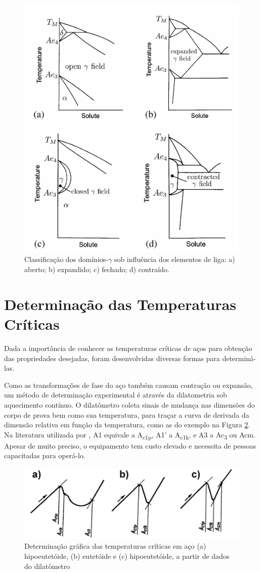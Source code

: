 \documentclass[brazil,tf,epusp]{usp}  %
\begin{document}
\begin{figure}[ht!]
  \includegraphics[width=.7\textwidth]{img/elementos-liga.png}
  \caption{Classificação dos domínios-$\gamma$ sob influência dos elementos de liga: a) aberto; b) expandido; c) fechado; d) contraído. \cite{Honeycombe1982}}
  \label{fig:elem-liga}
\end{figure}

\section{Determinação das Temperaturas Críticas}

Dada a importância de conhecer as temperaturas críticas de aços para obtenção das propriedades desejadas, foram desenvolvidas diversas formas para determiná-las.

Como as transformações de fase do aço também causam contração ou expansão, um método de determinação experimental é através da dilatometria sob aquecimento contínuo. O dilatômetro coleta sinais de mudança nas dimensões do corpo de prova bem como sua temperatura, para traçar a curva de derivada da dimensão relativa em função da temperatura, como as do exemplo na Figura \ref{fig:dilatometer}. Na literatura utilizada por , A1 equivale a A\textsubscript{c1p}, A1' a A\textsubscript{c1k}, e A3 a Ac\textsubscript{3} ou Acm. Apesar de muito preciso, o equipamento tem custo elevado e necessita de pessoas capacitadas para operá-lo.

\begin{figure}[ht!]
  \includegraphics[width=.9\textwidth]{img/dilatometer.png}
  \caption{Determinação gráfica das temperaturas críticas em aço (a) hipoeutetóide, (b) eutetóide e (c) hipoeutetóide, a partir de dados do dilatômetro \cite{Pawlowski2012}}
  \label{fig:dilatometer}
\end{figure}
\end{document}
